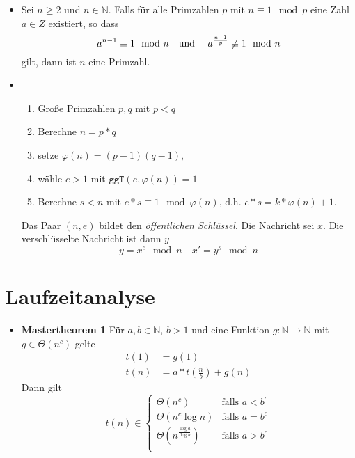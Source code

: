 \documentclass[landscape, 8pt, a4paper]{extarticle}
\newcommand{\ggT}{\texttt{ggT}}
\newcommand{\N}{\mathbb{N}}
\begin{document}
\begin{multicols}{3}
\begin{itemize}
		\item Sei $n\geq 2$ und $n\in\N$. Falls für alle Primzahlen $p$ mit $n\equiv 1\mod p$ eine Zahl $a\in Z$ existiert, so dass
		\begin{equation*}
		 	a^{n-1}\equiv 1\mod n \text{\quad und \quad}a^{\frac{n-1}p}\not\equiv 1\mod n
		\end{equation*}
		gilt, dann ist $n$ eine Primzahl. 

		\item 
		\begin{enumerate}
			\item Große Primzahlen $p,q$ mit $p<q$
			\item Berechne $n=p*q$
			\item setze $\varphi(n)=(p-1)(q-1)$,
			\item wähle $e>1$ mit $\ggT(e,\varphi(n))=1$
			\item Berechne $s<n$ mit $e*s\equiv 1\mod \varphi(n)$, d.h. $e*s=k*\varphi(n)+1$. 
		\end{enumerate}
		Das Paar $(n,e)$ bildet den \emph{öffentlichen Schlüssel}. Die Nachricht sei $x$. Die verschlüsselte Nachricht ist dann $y$
		\begin{equation*}
			y=x^e\mod n\quad x'=y^s\mod n
		\end{equation*}
	\end{itemize}

	\section{Laufzeitanalyse}

	\begin{itemize}
		\item \textbf{Mastertheorem 1} Für $a,b\in\N$, $b>1$ und eine Funktion $g:\N\rightarrow \N$ mit $g\in\Theta(n^c)$ gelte
		\begin{align*}
			t(1)&=g(1)\\
			t(n)&=a*t\left(\frac nb\right)+g(n)
		\end{align*}
		Dann gilt 
		\begin{equation*}
			t(n)\in\begin{cases}
			\Theta(n^c)&\text{falls }a<b^c\\
			\Theta(n^c\log n)&\text{falls }a=b^c\\
			\Theta(n^{\frac{\log a}{\log b}})&\text{falls }a>b^c\\
			\end{cases}
		\end{equation*}


\end{itemize}
\end{multicols}
\end{document}
